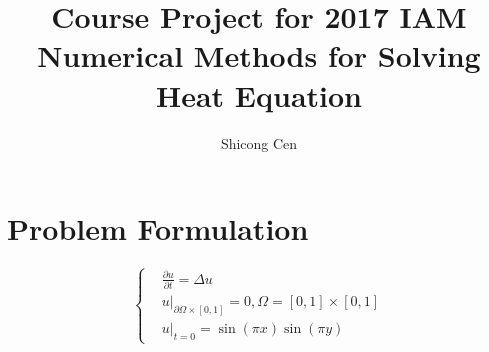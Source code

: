 \documentclass{article}
\begin{document}
\author{Shicong Cen}
\title{Course Project for 2017 IAM\\Numerical Methods for Solving Heat Equation}
\maketitle
\section{Problem Formulation}
$$
\left\{
\begin{aligned}
&\frac{\partial u}{\partial t} = \Delta u\\
&u|_{\partial \Omega\times[0,1]} = 0, \Omega = [0,1]\times [0,1]\\
&u|_{t=0}=\sin(\pi x)\sin(\pi y)
\end{aligned}
\right.
$$
\end{document}
